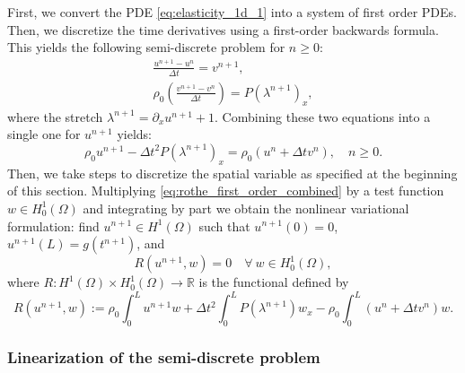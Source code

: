 \documentclass{sfuthesis}
\numberwithin{equation}{section}
\numberwithin{figure}{chapter}
\numberwithin{table}{chapter}
\theoremstyle{definition}
\newcommand{\R}{\mathbb{R}}
\begin{document}
First, we convert the PDE \eqref{eq:elasticity_1d_1} into a system of first order PDEs. Then, we discretize the time derivatives using a first-order backwards formula. This yields the following semi-discrete problem for $n \geq 0$:
\begin{subequations} \label{eq:rothe_first_order}
    \begin{gather}
        \label{eq:disc_u} \frac{u^{n+1}-u^n}{\Delta t} = v^{n+1}, \\
	    \label{eq:disc_v} \rho_0 \left( \frac{v^{n+1}-v^n}{\Delta t} \right) = 
        P(\lambda^{n+1})_x,
    \end{gather}
\end{subequations}
where the stretch $\lambda^{n+1} = \partial_x u^{n+1} + 1$. Combining these two equations into a single one for $u^{n+1}$ yields:
\begin{equation} \label{eq:rothe_first_order_combined}
	\rho_0 u^{n+1} - \Delta t^2 P(\lambda^{n+1})_x = \rho_0 (u^n + \Delta t v^n), \quad n \geq 0.
\end{equation}
Then, we take steps to discretize the spatial variable as specified at the beginning of this section. Multiplying \eqref{eq:rothe_first_order_combined} by a test function $w \in H_0^1(\Omega)$ and integrating by part we obtain the nonlinear variational formulation: find $u^{n+1} \in  H^1(\Omega)$ such that $u^{n+1}(0) = 0$, $u^{n+1}(L) = g(t^{n+1})$, and
\begin{equation} \label{eq:rothe_first_order_VF}
	R(u^{n+1}, w) = 0 \quad \forall \ w \in H_0^1(\Omega),
\end{equation}
where $R:H^1(\Omega) \times H_0^1(\Omega) \to \R$ is the functional defined by
\begin{equation}
    R(u^{n+1},w) := \rho_0 \int_0^L u^{n+1} w + \Delta t^2 \int_0^L P(\lambda^{n+1}) w_x - \rho_0 \int_0^L (u^n + \Delta t v^n) w.
\end{equation}

\subsubsection*{Linearization of the semi-discrete problem}
\end{document}
